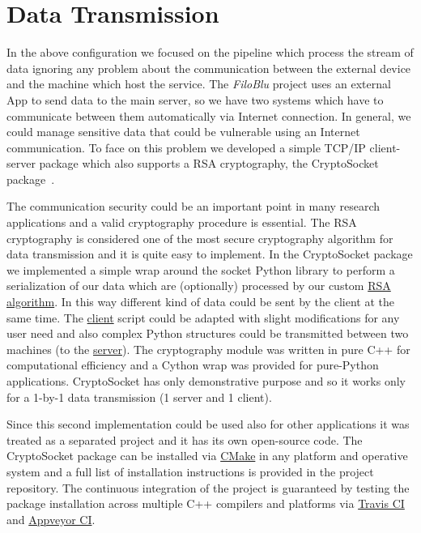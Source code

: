\documentclass{standalone}
\begin{document}
\section*{Data Transmission}

In the above configuration we focused on the pipeline which process the stream of data ignoring any problem about the communication between the external device and the machine which host the service.
The \emph{FiloBlu} project uses an external App to send data to the main server, so we have two systems which have to communicate between them automatically via Internet connection.
In general, we could manage sensitive data that could be vulnerable using an Internet communication.
To face on this problem we developed a simple TCP/IP client-server package which also supports a RSA cryptography, the \textsf{CryptoSocket} package~\cite{CryptoSocket}.

The communication security could be an important point in many research applications and a valid cryptography procedure is essential.
The RSA cryptography is considered one of the most secure cryptography algorithm for data transmission and it is quite easy to implement.
In the \textsf{CryptoSocket} package we implemented a simple wrap around the \textsf{socket} \textsf{Python} library to perform a serialization of our data which are (optionally) processed by our custom \href{https://en.wikipedia.org/wiki/RSA_(cryptosystem)}{RSA algorithm}.
In this way different kind of data could be sent by the client at the same time.
The \href{https://github.com/Nico-Curti/CryptoSocket/blob/master/CryptoSocket/examples/client.py}{client} script could be adapted with slight modifications for any user need and also complex \textsf{Python} structures could be transmitted between two machines (to the \href{https://github.com/Nico-Curti/CryptoSocket/blob/master/CryptoSocket/examples/server.py}{server}).
The cryptography module was written in pure \textsf{C++} for computational efficiency and a \textsf{Cython} wrap was provided for pure-\textsf{Python} applications.
\textsf{CryptoSocket} has only demonstrative purpose and so it works only for a 1-by-1 data transmission (1 server and 1 client).

Since this second implementation could be used also for other applications it was treated as a separated project and it has its own open-source code.
The \textsf{CryptoSocket} package can be installed via \href{https://github.com/Nico-Curti/CryptoSocket/blob/master/CMakeLists.txt}{\textsf{CMake}} in any platform and operative system and a full list of installation instructions is provided in the project repository.
The continuous integration of the project is guaranteed by testing the package installation across multiple \textsf{C++} compilers and platforms via \href{https://github.com/Nico-Curti/CryptoSocket/blob/master/.travis.yml}{Travis CI} and \href{https://github.com/Nico-Curti/CryptoSocket/blob/master/appveyor.yml}{Appveyor CI}.
\end{document}
